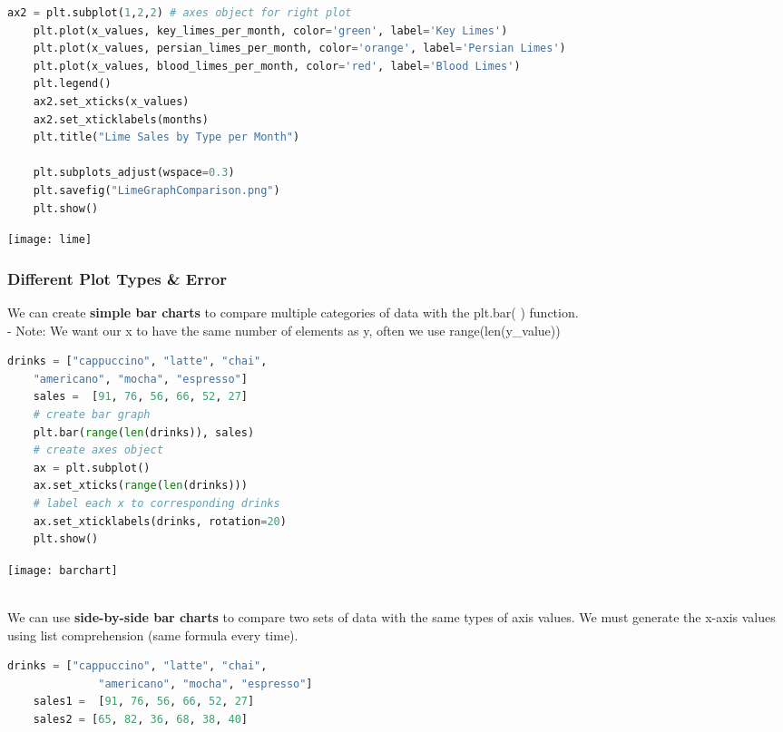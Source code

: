 \documentclass[11pt, a4paper]{article}
\begin{document}
\begin{spacing}{1.1}
\begin{lstlisting}[language=Python]
	ax2 = plt.subplot(1,2,2) # axes object for right plot
	plt.plot(x_values, key_limes_per_month, color='green', label='Key Limes')
	plt.plot(x_values, persian_limes_per_month, color='orange', label='Persian Limes')
	plt.plot(x_values, blood_limes_per_month, color='red', label='Blood Limes')
	plt.legend()
	ax2.set_xticks(x_values)
	ax2.set_xticklabels(months)
	plt.title("Lime Sales by Type per Month")
	
	plt.subplots_adjust(wspace=0.3)
	plt.savefig("LimeGraphComparison.png")
	plt.show() \end{lstlisting}\vspace*{1mm}
	\texttt{[image: lime]} \newpage
	\subsubsection{Different Plot Types \& Error}
	We can create \textbf{simple bar charts} to compare multiple categories of data with the plt.bar( ) function.\\
	\hspace*{3mm} - Note: We want our x to have the same number of elements as y, often we use range(len(y\_value))
	\begin{minipage}[c]{9cm}
	\begin{lstlisting}[language=Python]
	drinks = ["cappuccino", "latte", "chai", 
	"americano", "mocha", "espresso"]
	sales =  [91, 76, 56, 66, 52, 27]
	# create bar graph
	plt.bar(range(len(drinks)), sales) 
	# create axes object
	ax = plt.subplot()
	ax.set_xticks(range(len(drinks)))
	# label each x to corresponding drinks
	ax.set_xticklabels(drinks, rotation=20)	
	plt.show() \end{lstlisting}\vspace*{1mm}
	\end{minipage}
	\begin{minipage}[c]{8cm}
	\texttt{[image: barchart]}
	\end{minipage} \vspace*{1mm} \\
	We can use \textbf{side-by-side bar charts} to compare two sets of data with the same types of axis values. We must generate the x-axis values using list comprehension (same formula every time). \\
	\begin{minipage}[c]{9.2cm}
	\begin{lstlisting}[language=Python]
	drinks = ["cappuccino", "latte", "chai", 
	          "americano", "mocha", "espresso"]
	sales1 =  [91, 76, 56, 66, 52, 27]
	sales2 = [65, 82, 36, 68, 38, 40]
		

\end{lstlisting}
\end{minipage}
\end{spacing}
\end{document}
